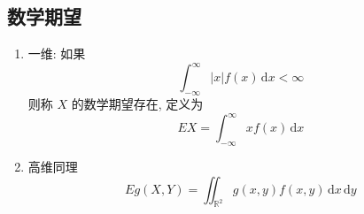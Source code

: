 \documentclass[11pt,a4paper,twocolumn]{article} %
\numberwithin{equation}{section} %
\newcommand{\dif}{\,\mathrm d}
\begin{document}
\subsection{数学期望} %
\label{sub:expectation_conti}
\begin{enumerate}
	\item 一维: 如果
	\begin{equation}
		\int_{-\infty}^\infty |x|f(x)\dif x < \infty
	\end{equation}
	则称 $X$ 的数学期望存在, 定义为
	\begin{equation}
		EX = \int_{-\infty}^\infty xf(x)\dif x 
	\end{equation}
	\item 高维同理
	\begin{equation}
		Eg(X,Y) = \iint_{\mathbb R^2} g(x,y)f(x, y)\dif x\dif y
	\end{equation}
\end{enumerate}
\end{document}
